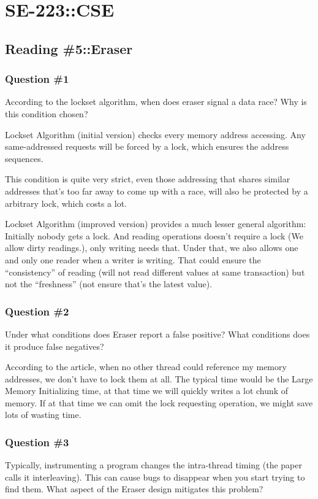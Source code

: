 \documentclass[
]{article}
\date{}
\begin{document}
\section{SE-223::CSE}

\subsection{Reading \#5::Eraser}

\subsubsection{Question \#1} According to the lockset algorithm, when does eraser signal a data race? Why is this condition chosen?

Lockset Algorithm (initial version) checks every memory address accessing. Any same-addressed requests will be forced by a lock, which ensures the address sequences.

This condition is quite very strict, even those addressing that shares similar addresses that's too far away to come up with a race, will also be protected by a arbitrary lock, which costs a lot.

Lockset Algorithm (improved version) provides a much lesser general algorithm: Initially nobody gets a lock. And reading operations doesn't require a lock (We allow dirty readings.), only writing needs that. Under that, we also allows one and only one reader when a writer is writing. That could ensure the ``consistency'' of reading (will not read different values at same transaction) but not the ``freshness'' (not ensure that's the latest value).

\subsubsection{Question \#2} Under what conditions does Eraser report a false positive? What conditions does it produce false negatives?

According to the article, when no other thread could reference my memory addresses, we don't have to lock them at all. The typical time would be the Large Memory Initializing time, at that time we will quickly writes a lot chunk of memory. If at that time we can omit the lock requesting operation, we might save lots of wasting time.

\subsubsection{Question \#3} Typically, instrumenting a program changes the intra-thread timing (the paper calls it interleaving). This can cause bugs to disappear when you start trying to find them. What aspect of the Eraser design mitigates this problem?
\end{document}
